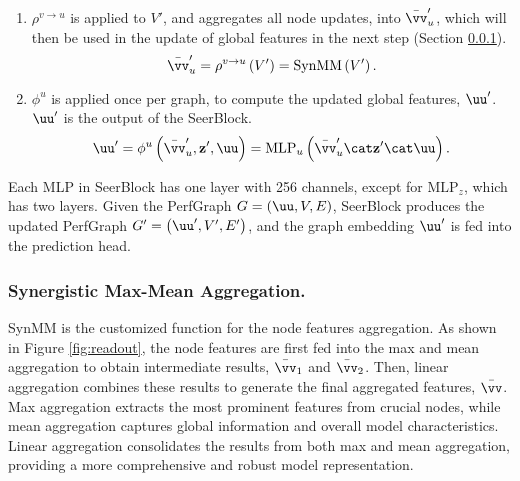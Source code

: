 \begin{enumerate}
\item $\rho^{v \rightarrow u}$ is applied to $V'$, and aggregates all node updates, into $\bar{\vv}_u'$, which will then be used in the update of global features in the next step (Section \ref{sec:synmm}). 
\begin{equation}
    \bar{\vv}_u' = \rho^{v\rightarrow u}\left(V'\right) = \text{SynMM}\left(V'\right).
\end{equation}

\item $\phi^u$ is applied once per graph, 
to compute the updated global features, $\uu'$. $\uu'$ is the output of the SeerBlock.
\begin{equation}
    \uu' = \phi^u\left(\bar{\vv}_u', \mathbf{z'}, \uu\right) = \mathrm{MLP}_u\left(\bar{\vv}_u' \cat \mathbf{z'} \cat \uu\right).
\end{equation}

\end{enumerate}
Each MLP in SeerBlock has one layer with 256 channels, except for $\text{MLP}_z$, which has two layers. Given the PerfGraph $G = \left(\uu, V, E\right)$, SeerBlock produces the updated PerfGraph $G' = \left(\uu', V', E'\right)$, and the graph embedding $\uu'$ is fed into the prediction head.


\subsubsection{Synergistic Max-Mean Aggregation.}\label{sec:synmm}
SynMM is the customized function for the node features aggregation. As shown in Figure \ref{fig:readout}, the node features are first fed into the max and mean aggregation to obtain intermediate results, $\bar{\vv}_1$ and $\bar{\vv}_2$. 
Then, linear aggregation combines these results to generate the final aggregated features, $\bar{\vv}$. 
Max aggregation extracts the most prominent features from crucial nodes, while mean aggregation captures global information and overall model characteristics. 
Linear aggregation consolidates the results from both max and mean aggregation, providing a more comprehensive and robust model representation.

